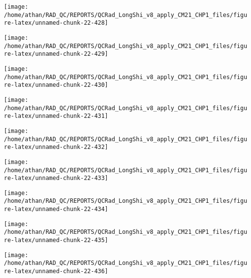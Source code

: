 \documentclass[
  10pt,
  a4paper,oneside]{article}
\begin{document}
\begin{center}\texttt{[image: /home/athan/RAD\_QC/REPORTS/QCRad\_LongShi\_v8\_apply\_CM21\_CHP1\_files/figure-latex/unnamed-chunk-22-428]} \end{center}

\begin{center}\texttt{[image: /home/athan/RAD\_QC/REPORTS/QCRad\_LongShi\_v8\_apply\_CM21\_CHP1\_files/figure-latex/unnamed-chunk-22-429]} \end{center}

\begin{center}\texttt{[image: /home/athan/RAD\_QC/REPORTS/QCRad\_LongShi\_v8\_apply\_CM21\_CHP1\_files/figure-latex/unnamed-chunk-22-430]} \end{center}

\begin{center}\texttt{[image: /home/athan/RAD\_QC/REPORTS/QCRad\_LongShi\_v8\_apply\_CM21\_CHP1\_files/figure-latex/unnamed-chunk-22-431]} \end{center}

\begin{center}\texttt{[image: /home/athan/RAD\_QC/REPORTS/QCRad\_LongShi\_v8\_apply\_CM21\_CHP1\_files/figure-latex/unnamed-chunk-22-432]} \end{center}

\begin{center}\texttt{[image: /home/athan/RAD\_QC/REPORTS/QCRad\_LongShi\_v8\_apply\_CM21\_CHP1\_files/figure-latex/unnamed-chunk-22-433]} \end{center}

\begin{center}\texttt{[image: /home/athan/RAD\_QC/REPORTS/QCRad\_LongShi\_v8\_apply\_CM21\_CHP1\_files/figure-latex/unnamed-chunk-22-434]} \end{center}

\begin{center}\texttt{[image: /home/athan/RAD\_QC/REPORTS/QCRad\_LongShi\_v8\_apply\_CM21\_CHP1\_files/figure-latex/unnamed-chunk-22-435]} \end{center}

\begin{center}\texttt{[image: /home/athan/RAD\_QC/REPORTS/QCRad\_LongShi\_v8\_apply\_CM21\_CHP1\_files/figure-latex/unnamed-chunk-22-436]} \end{center}
\end{document}
